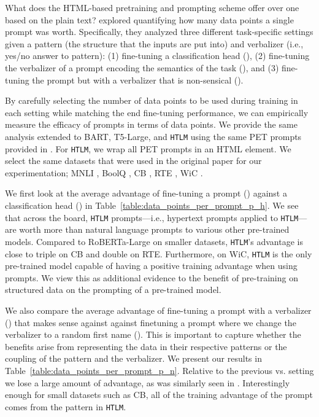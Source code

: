 \documentclass[11pt,a4paper]{article}
\newcommand{\HTLM}{\texttt{HTLM}}
\begin{document}
What does the HTML-based pretraining and prompting scheme offer over one based on the plain text? \citet{how_many_datapoints} explored quantifying how many data points a single prompt was worth. Specifically, they analyzed three different task-specific settings given a pattern (the structure that the inputs are put into) and verbalizer (i.e., yes/no answer to pattern): (1) fine-tuning a classification head (), (2) fine-tuning the verbalizer of a prompt encoding the semantics of the task (), and (3) fine-tuning the prompt but with a verbalizer that is non-sensical ().

By carefully selecting the number of data points to be used during training in each setting while matching the end fine-tuning performance, we can empirically measure the efficacy of prompts in terms of data points. We provide the same analysis extended to BART, T5-Large, and \HTLM{} using the same PET prompts provided in \citet{itsnotjustsize}. For \HTLM{}, we wrap all PET prompts in an HTML element. We select the same datasets that were used in the original paper for our experimentation; MNLI \citep{mnli}, BoolQ \citep{clark2019boolq}, CB \cite{demarneffe:cb}, RTE \citep{rte}, WiC \cite{pilehvar2018wic}.

We first look at the average advantage of fine-tuning a prompt () against a classification head () in Table~\ref{table:data_points_per_prompt_p_h}. We see that across the board, \HTLM{} prompts---i.e., hypertext prompts applied to \HTLM{}---are worth more than natural language prompts to various other pre-trained models. Compared to RoBERTa-Large on smaller datasets, \HTLM{}'s advantage is close to triple on CB and double on RTE. Furthermore, on WiC, \HTLM{} is the only pre-trained model capable of having a positive training advantage when using prompts. We view this as additional evidence to the benefit of pre-training on structured data on the prompting of a pre-trained model.

We also compare the average advantage of fine-tuning a prompt with a verbalizer () that makes sense against against finetuning a prompt where we change the verbalizer to a random first name (). This is important to capture whether the benefits arise from representing the data in their respective patterns or the coupling of the pattern and the verbalizer. We present our results in Table~\ref{table:data_points_per_prompt_p_n}. Relative to the previous  vs.  setting we lose a large amount of advantage, as was similarly seen in \citep{how_many_datapoints}. Interestingly enough for small datasets such as CB, all of the training advantage of the prompt comes from the pattern in \HTLM{}.
\end{document}
